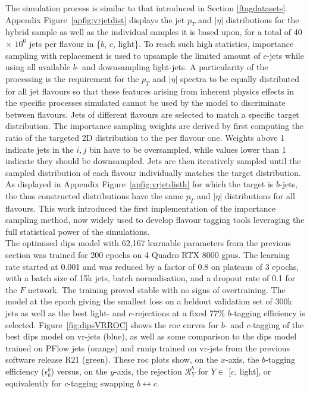 The simulation process is similar to that introduced in Section \ref{ftagdatasets}. Appendix Figure~\ref{apfig:vrjetdist} displays the jet $p_T$ and $|\eta|$ distributions for the hybrid sample as well as the individual samples it is based upon, for a total of 40 $\times$ $10^6$ jets per flavour in \{$b$, $c$, light\}. To reach such high statistics, importance sampling with replacement is used to upsample the limited amount of $c$-jets while using all available $b$- and downsampling light-jets. A particularity of the processing is the requirement for the $p_T$ and $|\eta|$ spectra to be equally distributed for all jet flavours so that these features arising from inherent physics effects in the specific processes simulated cannot be used by the model to discriminate between flavours. Jets of different flavours are selected to match a specific target distribution. The importance sampling weights are derived by first computing the ratio of the targeted 2D distribution to the per flavour one. Weights above 1 indicate jets in the $i, j$ bin have to be oversampled, while values lower than 1 indicate they should be downsampled. Jets are then iteratively sampled until the sampled distribution of each flavour individually matches the target distribution. As displayed in Appendix Figure~\ref{apfig:vrjetdisth} for which the target is $b$-jets, the thus constructed distributions have the same $p_T$ and $|\eta|$ distributions for all flavours. This work introduced the first implementation of the importance sampling method, now widely used to develop flavour tagging tools leveraging the full statistical power of the simulations. \\ 
 
The optimised \gls{dips} model with 62,167 learnable parameters from the previous section was trained for 200 epochs on 4 Quadro RTX 8000 \glspl{gpu}. The learning rate started at 0.001 and was reduced by a factor of 0.8 on plateaus of 3 epochs, with a batch size of 15k jets, batch normalisation, and a dropout rate of 0.1 for the $F$ network. The training proved stable with no signs of overtraining. The model at the epoch giving the smallest loss on a heldout validation set of 300k jets as well as the best light- and $c$-rejections at a fixed 77\% $b$-tagging efficiency is selected. Figure~\ref{fig:dipsVRROC} shows the \gls{roc} curves for $b$- and $c$-tagging of the best \gls{dips} model on \gls{vr}-jets (blue), as well as some comparison to the \gls{dips} model trained on PFlow jets (orange) and \gls{rnnip} trained on \gls{vr}-jets from the previous software release R21 (green). These \gls{roc} plots show, on the $x$-axis, the $b$-tagging efficiency ($\epsilon^b_b$) versus, on the $y$-axis, the rejection $\mathcal{R}^b_Y$ for $Y \in$ [$c$, light], or equivalently for $c$-tagging swapping $b \leftrightarrow c$.\\

